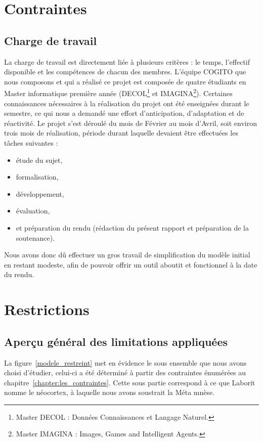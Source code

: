 \section{Contraintes}

\subsection{Charge de travail}
La charge de travail est directement liée à plusieurs critères : le temps,
l'effectif disponible et les compétences de chacun des membres. L'équipe COGITO que nous 
composons et qui a réalisé ce projet est composée de
quatre étudiants en Master informatique première année (DECOL\footnote{Master
DECOL : Données Connaissances et Langage Naturel.} et IMAGINA\footnote{Master
IMAGINA : Images, Games and Intelligent Agents.}). Certaines connaissances 
nécessaires à la réalisation du projet ont été enseignées durant le semestre, ce qui nous a demandé une effort d'anticipation, d'adaptation et de réactivité. Le projet s'est déroulé du mois de Février au mois d'Avril, soit environ trois mois de réalisation, période durant laquelle devaient être effectuées les tâches
suivantes :

\begin{itemize}
\item étude du sujet, 
\item formalisation, 
\item développement, 
\item évaluation,
\item et préparation du rendu (rédaction du présent rapport et préparation de la soutenance).
\end{itemize}

Nous avons donc dû effectuer un gros travail de simplification du modèle initial en restant modeste, afin de pouvoir offrir un outil aboutit et fonctionnel à la date du rendu.

\section{Restrictions}

\subsection{Aperçu général des limitations appliquées}

La figure~\ref{modele_restreint} met en évidence le sous ensemble que nous avons choisi d'étudier, celui-ci a été déterminé à partir des contraintes énumérées au chapitre~\ref{chapter:les_contraintes}. Cette sous partie correspond à ce que Laborit nomme le néocortex, à laquelle nous avons soustrait la Méta mnèse.

